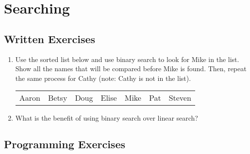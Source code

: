 \section{Searching}

\subsection{Written Exercises}

\setcounter{counter}{1}
\begin{enumerate}[label={\arabic{counter}\addtocounter{counter}{1}}.]

\item Use the sorted list below and use binary search to look for Mike in the list. Show all the names that will be compared before Mike is found. Then, repeat the same process for Cathy (note: Cathy is not in the list).
\begin{table}[h]
\begin{tabular}{lllllll}
Aaron & Betsy & Doug & Elise & Mike & Pat & Steven
\end{tabular}
\end{table}

\item What is the benefit of using binary search over linear search?


\end{enumerate}

\subsection{Programming Exercises}